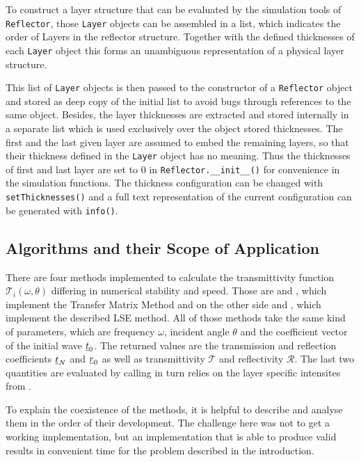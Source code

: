 To construct a layer structure that can be evaluated by the simulation tools of
\texttt{Reflector}, those \texttt{Layer} objects can be assembled in a list,
which indicates the order of Layers in the reflector structure. Together with
the defined thicknesses of each \texttt{Layer} object this forms an unambiguous
representation of a physical layer structure.

This list of \texttt{Layer} objects is then passed to the constructor of a
\texttt{Reflector} object and stored as deep copy of the initial list to avoid
bugs through references to the same object. Besides, the layer thicknesses are
extracted and stored internally in a separate list which is used exclusively
over the object stored thicknesses. The first and the last given
layer are assumed to embed the remaining layers, so that their thickness
defined in the \texttt{Layer} object has no meaning. Thus the thicknesses of
first and last layer are set to $0$ in \texttt{Reflector.\_\_init\_\_()} for
convenience in the simulation functions. The thickness configuration can be
changed with \texttt{setThicknesses()} and a full text representation of the
current configuration can be generated with \texttt{info()}.

\subsection{Algorithms and their Scope of Application }
There are four methods implemented to calculate the transmittivity function
$\mathcal{T}_i(\omega, \theta)$ differing in numerical stability and speed.
Those are  and , which implement
the Transfer Matrix Method and on the other side  and
, which implement the described LSE method. All of those
methods take the same kind of parameters, which are frequency $\omega$,
incident angle $\theta$ and the coefficient vector of the initial wave
$\underline{t}_0$. The returned values are the transmission and reflection
coefficients $\underline{t}_N$ and $\underline{r}_0$ as well as transmittivity
$\mathcal{T}$ and reflectivity $\mathcal{R}$. The last two quantities
are evaluated by calling  in turn relies on
the layer specific intensites from .

To explain the coexistence of the methods, it is helpful to describe and
analyse them in the order of their development. The challenge here was not to
get a working implementation, but an implementation that is able to produce
valid results in convenient time for the problem described in the introduction.

